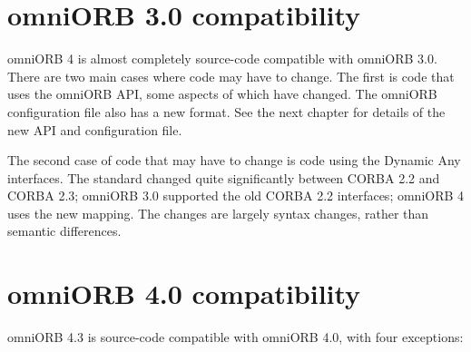 \documentclass[11pt,oneside,a4paper]{book}
\begin{document}
\section{omniORB 3.0 compatibility}

omniORB 4 is almost completely source-code compatible with omniORB
3.0. There are two main cases where code may have to change. The first
is code that uses the omniORB API, some aspects of which have
changed. The omniORB configuration file also has a new format. See the
next chapter for details of the new API and configuration file.

The second case of code that may have to change is code using the
Dynamic Any interfaces. The standard changed quite significantly
between CORBA 2.2 and CORBA 2.3; omniORB 3.0 supported the old CORBA
2.2 interfaces; omniORB 4 uses the new mapping. The changes are
largely syntax changes, rather than semantic differences.


\section{omniORB 4.0 compatibility}

omniORB 4.3 is source-code compatible with omniORB 4.0, with four
exceptions:
\end{document}
